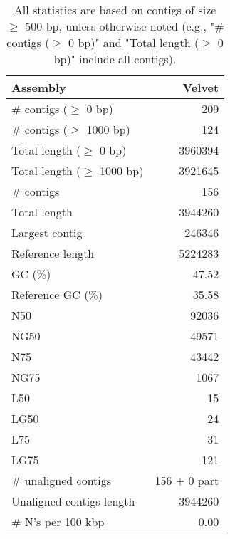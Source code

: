 \documentclass[12pt,a4paper]{article}
\begin{document}
\begin{table}[ht]
\begin{center}
\caption{All statistics are based on contigs of size $\geq$ 500 bp, unless otherwise noted (e.g., "\# contigs ($\geq$ 0 bp)" and "Total length ($\geq$ 0 bp)" include all contigs).}
\begin{tabular}{|l*{1}{|r}|}
\hline
Assembly & Velvet \\ \hline
\# contigs ($\geq$ 0 bp) & 209 \\ \hline
\# contigs ($\geq$ 1000 bp) & 124 \\ \hline
Total length ($\geq$ 0 bp) & 3960394 \\ \hline
Total length ($\geq$ 1000 bp) & 3921645 \\ \hline
\# contigs & 156 \\ \hline
Total length & 3944260 \\ \hline
Largest contig & 246346 \\ \hline
Reference length & 5224283 \\ \hline
GC (\%) & 47.52 \\ \hline
Reference GC (\%) & 35.58 \\ \hline
N50 & 92036 \\ \hline
NG50 & 49571 \\ \hline
N75 & 43442 \\ \hline
NG75 & 1067 \\ \hline
L50 & 15 \\ \hline
LG50 & 24 \\ \hline
L75 & 31 \\ \hline
LG75 & 121 \\ \hline
\# unaligned contigs & 156 + 0 part \\ \hline
Unaligned contigs length & 3944260 \\ \hline
\# N's per 100 kbp & 0.00 \\ \hline
\end{tabular}
\end{center}
\end{table}
\end{document}
